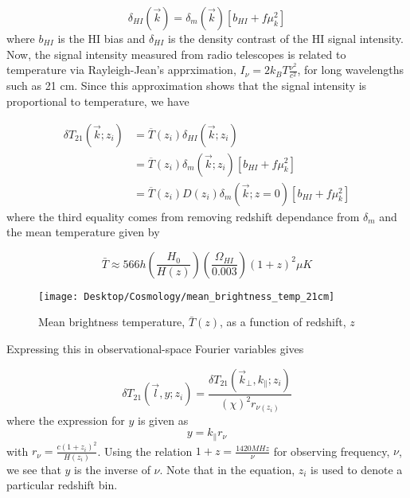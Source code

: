 \documentclass[12pt]{article}
\begin{document}
\begin{equation}\label{delta HI to delta m}
\delta_{HI}(\vec{k})=\delta_m(\vec{k})[b_{HI}+f\mu_k^2]
\end{equation}
where $b_{HI}$ is the HI bias and $\delta_{HI}$ is the density contrast of the HI signal intensity. Now, the signal intensity measured from radio telescopes is related to temperature via Rayleigh-Jean's apprximation, $I_\nu=2k_BT\frac{\nu^2}{c^2}$, for long wavelengths such as 21 cm. Since this approximation shows that the signal intensity is proportional to temperature, we have 

\begin{equation}\label{delta 21 ito k}
\begin{aligned}
\delta T_{21}(\vec{k};z_i)&=\overline{T}(z_i)\delta_{HI}(\vec{k};z_i)
\\&=\overline{T}(z_i)\delta_m(\vec{k};z_i)[b_{HI}+f\mu_k^2]
\\&=\overline{T}(z_i)D(z_i)\delta_m(\vec{k};z=0)[b_{HI}+f\mu_k^2]
\end{aligned}
\end{equation}
where the third equality comes from removing redshift dependance from $\delta_m$ and the mean temperature given by

\begin{equation}\label{mean 21 cm temp}
\bar{T} \approx 566h \left(\frac{H_0}{H(z)}\right)\left(\frac{\Omega_{HI}}{0.003}\right)(1+z)^2 \mu K
\end{equation}

\begin{figure}
	\centering
	\texttt{[image: Desktop/Cosmology/mean\_brightness\_temp\_21cm]}
	\caption[Mean brightness temperature as a function of redshift]{Mean brightness temperature, $\bar{T}(z)$, as a function of redshift, $z$}
	\label{fig:meanbrightnesstemp21cm}
\end{figure}

Expressing this in observational-space Fourier variables gives %

\begin{equation}\label{delta 21 ito y and l final eqn}
\delta T_{21}(\vec{l},y;z_i)=\frac{\delta T_{21}(\vec{k}_\bot,k_\parallel;z_i)}{(\chi )^2r_{\nu(z_i)}}
\end{equation}
where the expression for $y$ is given as
\begin{equation}\label{y eqn}
y=k_\parallel r_\nu
\end{equation}
with $r_\nu=\frac{c(1+z_i)^2}{H(z_i)}$. Using the relation $1+z=\frac{1420 MHz}{\nu}$ for observing frequency, $\nu$, we see that $y$ is the inverse of $\nu$. Note that in the equation, $z_i$ is used to denote a particular redshift bin. 
\end{document}
